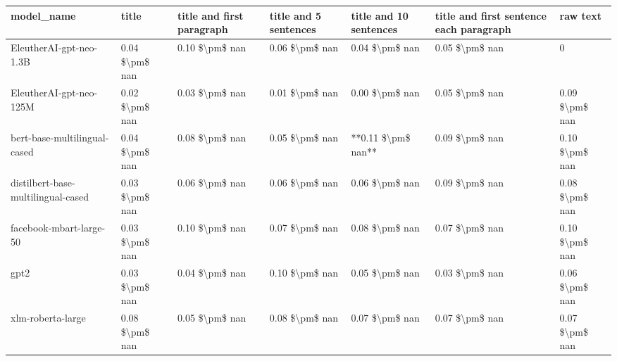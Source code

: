 \begin{tabular}{lllllll}
\toprule
                        model\_name &          title & title and first paragraph & title and 5 sentences & title and 10 sentences & title and first sentence each paragraph &       raw text \\
\midrule
           EleutherAI-gpt-neo-1.3B & 0.04 \$\textbackslash pm\$ nan &            0.10 \$\textbackslash pm\$ nan &        0.06 \$\textbackslash pm\$ nan &         0.04 \$\textbackslash pm\$ nan &                          0.05 \$\textbackslash pm\$ nan &              0 \\
           EleutherAI-gpt-neo-125M & 0.02 \$\textbackslash pm\$ nan &            0.03 \$\textbackslash pm\$ nan &        0.01 \$\textbackslash pm\$ nan &         0.00 \$\textbackslash pm\$ nan &                          0.05 \$\textbackslash pm\$ nan & 0.09 \$\textbackslash pm\$ nan \\
      bert-base-multilingual-cased & 0.04 \$\textbackslash pm\$ nan &            0.08 \$\textbackslash pm\$ nan &        0.05 \$\textbackslash pm\$ nan &     **0.11 \$\textbackslash pm\$ nan** &                          0.09 \$\textbackslash pm\$ nan & 0.10 \$\textbackslash pm\$ nan \\
distilbert-base-multilingual-cased & 0.03 \$\textbackslash pm\$ nan &            0.06 \$\textbackslash pm\$ nan &        0.06 \$\textbackslash pm\$ nan &         0.06 \$\textbackslash pm\$ nan &                          0.09 \$\textbackslash pm\$ nan & 0.08 \$\textbackslash pm\$ nan \\
           facebook-mbart-large-50 & 0.03 \$\textbackslash pm\$ nan &            0.10 \$\textbackslash pm\$ nan &        0.07 \$\textbackslash pm\$ nan &         0.08 \$\textbackslash pm\$ nan &                          0.07 \$\textbackslash pm\$ nan & 0.10 \$\textbackslash pm\$ nan \\
                              gpt2 & 0.03 \$\textbackslash pm\$ nan &            0.04 \$\textbackslash pm\$ nan &        0.10 \$\textbackslash pm\$ nan &         0.05 \$\textbackslash pm\$ nan &                          0.03 \$\textbackslash pm\$ nan & 0.06 \$\textbackslash pm\$ nan \\
                 xlm-roberta-large & 0.08 \$\textbackslash pm\$ nan &            0.05 \$\textbackslash pm\$ nan &        0.08 \$\textbackslash pm\$ nan &         0.07 \$\textbackslash pm\$ nan &                          0.07 \$\textbackslash pm\$ nan & 0.07 \$\textbackslash pm\$ nan \\
\bottomrule
\end{tabular}
